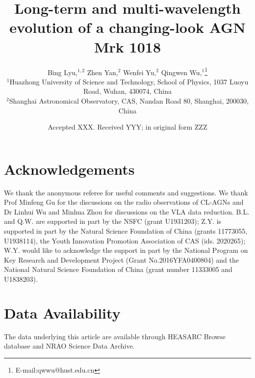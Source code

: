 \documentclass[fleqn,usenatbib]{mnras}
\title[Mrk1018]{Long-term and multi-wavelength evolution of a changing-look AGN Mrk 1018}
\author[Bing Lyu et al.]{
Bing Lyu,$^{1,2}$
Zhen Yan,$^{2}$
Wenfei Yu,$^{2}$%
Qingwen Wu,$^{1}$\thanks{E-mail:qwwu@hust.edu.cn}
\\
$^{1}$Huazhong University of Science and Technology, School of Physics, 1037 Luoyu Road, Wuhan, 430074, China\\
$^{2}$Shanghai Astronomical Observatory, CAS, 
Nandan Road 80, Shanghai, 200030, China\\
}
\date{Accepted XXX. Received YYY; in original form ZZZ}
\begin{document}
\label{firstpage}
\pagerange{\pageref{firstpage}--\pageref{lastpage}}
\maketitle


\def\sectionautorefname{Section}
\def\subsectionautorefname{Section}












\section*{Acknowledgements}
We thank the anonymous referee for useful comments and suggestions. We thank Prof Minfeng Gu for the discussions on the radio observations of CL-AGNs and Dr Linhui Wu and Minhua Zhou for discussions on the VLA data reduction. B.L. and Q.W. are supported in part by the NSFC (grant U1931203); Z.Y. is supported in part by the Natural Science Foundation of China (grants 11773055, U1938114), the Youth Innovation Promotion Association of CAS (ids. 2020265); W.Y. would like to acknowledge the support in part by the National Program on Key Research and Development Project (Grant No.2016YFA0400804) and the National Natural Science Foundation of China (grant number 11333005 and U1838203).


\section*{Data Availability}
The data underlying this article are available through HEASARC Browse database and NRAO Science Data Archive.





\end{document}
